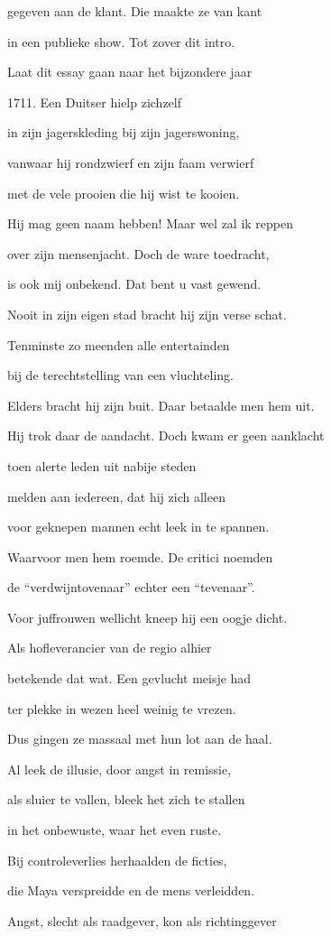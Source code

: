 gegeven aan de klant.
Die maakte ze van kant

in een publieke show.
Tot zover dit intro.

Laat dit essay gaan naar
het bijzondere jaar

1711.
Een Duitser hielp zichzelf

in zijn jagerskleding
bij zijn jagerswoning,

vanwaar hij rondzwierf
en zijn faam verwierf

met de vele prooien
die hij wist te kooien.

Hij mag geen naam hebben!
Maar wel zal ik reppen

over zijn mensenjacht.
Doch de ware toedracht,

is ook mij onbekend.
Dat bent u vast gewend.

Nooit in zijn eigen stad
bracht hij zijn verse schat.

Tenminste zo meenden
alle entertainden

bij de terechtstelling
van een vluchteling.

Elders bracht hij zijn buit.
Daar betaalde men hem uit.

Hij trok daar de aandacht.
Doch kwam er geen aanklacht

toen alerte leden
uit nabije steden

melden aan iedereen,
dat hij zich alleen

voor geknepen mannen
echt leek in te spannen.

Waarvoor men hem roemde.
De critici noemden

de “verdwijntovenaar”
echter een “tevenaar”.

Voor juffrouwen wellicht
kneep hij een oogje dicht.

Als hofleverancier
van de regio alhier

betekende dat wat.
Een gevlucht meisje had

ter plekke in wezen
heel weinig te vrezen.

Dus gingen ze massaal
met hun lot aan de haal.

Al leek de illusie,
door angst in remissie,

als sluier te vallen,
bleek het zich te stallen

in het onbewuste,
waar het even ruste.

Bij controleverlies
herhaalden de ficties,

die Maya verspreidde
en de mens verleidden.

Angst, slecht als raadgever,
kon als richtinggever

